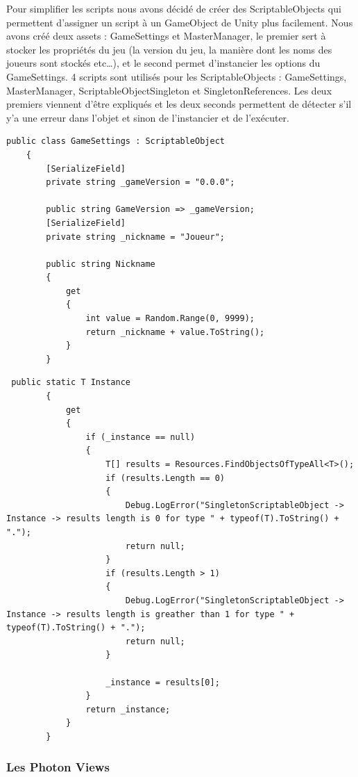 \documentclass{article}
\begin{document}
Pour simplifier les scripts nous avons décidé de créer des ScriptableObjects qui permettent d’assigner un script à un GameObject de Unity plus facilement. Nous avons créé deux assets : GameSettings et MasterManager, le premier sert à stocker les propriétés du jeu (la version du jeu, la manière dont les noms des joueurs sont stockés etc…), et le second permet d’instancier les options du GameSettings. 4 scripts sont utilisés pour les ScriptableObjects : GameSettings, MasterManager, ScriptableObjectSingleton et SingletonReferences. Les deux premiers viennent d’être expliqués et les deux seconds permettent de détecter s’il y’a une erreur dans l’objet et sinon de l'instancier et de l'exécuter.
\newpage
\begin{lstlisting}
public class GameSettings : ScriptableObject
    {
        [SerializeField]
        private string _gameVersion = "0.0.0";

        public string GameVersion => _gameVersion;
        [SerializeField]
        private string _nickname = "Joueur";

        public string Nickname
        {
            get
            {
                int value = Random.Range(0, 9999);
                return _nickname + value.ToString();
            }
        }
\end{lstlisting}

\begin{lstlisting}
 public static T Instance
        {
            get
            {
                if (_instance == null)
                {
                    T[] results = Resources.FindObjectsOfTypeAll<T>();
                    if (results.Length == 0)
                    {
                        Debug.LogError("SingletonScriptableObject -> Instance -> results length is 0 for type " + typeof(T).ToString() + ".");
                        return null;
                    }
                    if (results.Length > 1)
                    {
                        Debug.LogError("SingletonScriptableObject -> Instance -> results length is greather than 1 for type " + typeof(T).ToString() + ".");
                        return null;
                    }

                    _instance = results[0];
                }
                return _instance;
            }
        }
\end{lstlisting}



\subsubsection{Les Photon Views}
\end{document}
